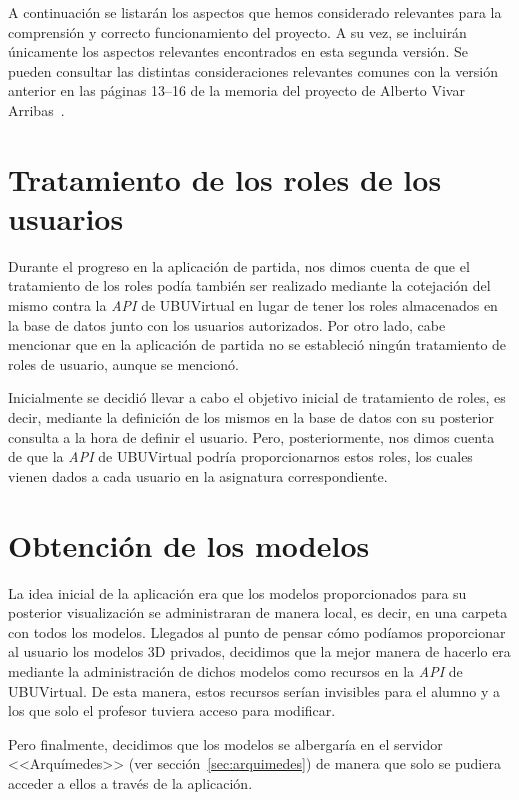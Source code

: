 A continuación se listarán los aspectos que hemos considerado relevantes para la comprensión y correcto funcionamiento del proyecto. A su vez, se incluirán únicamente los aspectos relevantes encontrados en esta segunda versión. Se pueden consultar las distintas consideraciones relevantes comunes con la versión anterior en las páginas 13--16 de la memoria del proyecto de Alberto Vivar Arribas~\cite{github:alberto-viewer}.

\section{Tratamiento de los roles de los usuarios}\label{sec:roles}
Durante el progreso en la aplicación de partida, nos dimos cuenta de que el tratamiento de los roles podía también ser realizado mediante la cotejación del mismo contra la \textit{API} de UBUVirtual en lugar de tener los roles almacenados en la base de datos junto con los usuarios autorizados. Por otro lado, cabe mencionar que en la aplicación de partida no se estableció ningún tratamiento de roles de usuario, aunque se mencionó.

Inicialmente se decidió llevar a cabo el objetivo inicial de tratamiento de roles, es decir, mediante la definición de los mismos en la base de datos con su posterior consulta a la hora de definir el usuario. Pero, posteriormente, nos dimos cuenta de que la \textit{API} de UBUVirtual podría proporcionarnos estos roles, los cuales vienen dados a cada usuario en la asignatura correspondiente.

\section{Obtención de los modelos}
La idea inicial de la aplicación era que los modelos proporcionados para su posterior visualización se administraran de manera local, es decir, en una carpeta con todos los modelos. Llegados al punto de pensar cómo podíamos proporcionar al usuario los modelos 3D privados, decidimos que la mejor manera de hacerlo era mediante la administración de dichos modelos como recursos en la \textit{API} de UBUVirtual. De esta manera, estos recursos  serían invisibles para el alumno y a los que solo el profesor tuviera acceso para modificar.

Pero finalmente, decidimos que los modelos se albergaría en el servidor <<Arquímedes>> (ver sección~\ref{sec:arquimedes}) de manera que solo se pudiera acceder a ellos a través de la aplicación.

